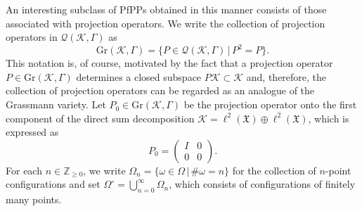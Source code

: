 \documentclass[11pt]{article}
\numberwithin{equation}{section}
\numberwithin{equation}{section}
\newcommand{\mfrak}[1]{\mathfrak{#1}}
\newcommand{\mcal}[1]{\mathcal{#1}}
\newcommand{\mbb}[1]{\mathbb{#1}}
\newcommand{\mrm}[1]{\mathrm{#1}}
\begin{document}
\setcounter{Theorem}{7}\setcounter{equation}{4}
An interesting subclass of PfPPs obtained in this manner consists of those associated with projection operators.
We write the collection of projection operators in $\mcal{Q}(\mcal{K},\Gamma)$ as
\begin{equation*}
	\mrm{Gr}(\mcal{K},\Gamma)=\big\{P\in\mcal{Q}(\mcal{K},\Gamma)\,|\,P^{2}=P\big\}.
\end{equation*}
This notation is, of course, motivated by the fact that a projection operator $P\in\mrm{Gr}(\mcal{K},\Gamma)$ determines a closed subspace $P\mcal{K}\subset\mcal{K}$ and, therefore, the collection of projection operators can be regarded as an analogue of the Grassmann variety.
Let $P_{0}\in \mrm{Gr}(\mcal{K},\Gamma)$ be the projection operator onto the first component of the direct sum decomposition $\mcal{K}=\ell^{2}(\mfrak{X})\oplus\ell^{2}(\mfrak{X})$, which is expressed as
\begin{equation}
\label{eq:projection_vacuum}
	P_{0}=\left(
	\begin{matrix}
		I & 0 \\
		0 & 0
	\end{matrix}
	\right).
\end{equation}
For each $n\in\mbb{Z}_{\ge 0}$, we write $\Omega_{n}=\{\omega\in \Omega\,|\, \#\omega=n\}$ for the collection of $n$-point configurations and set $\Omega^{\circ}=\bigcup_{n=0}^{\infty}\Omega_{n}$, which consists of configurations of finitely many points.


\setcounter{subsection}{2}\setcounter{Theorem}{8}\setcounter{equation}{5}
\end{document}
